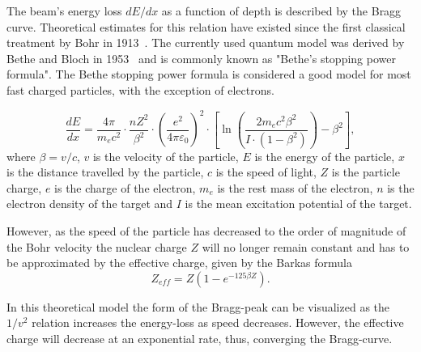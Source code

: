 The beam's energy loss $dE/dx$ as a function of depth is described by the Bragg curve. %
 Theoretical estimates for this relation have existed since the first classical treatment by Bohr in 1913~\cite{bohr13}. The currently used quantum model was derived by Bethe and Bloch in 1953~\cite{bethebloch53}  and is commonly known as "Bethe's stopping power formula". The Bethe stopping power formula is considered a good model for most fast charged particles, with the exception of electrons.

\begin{equation}
 \frac{dE}{dx} = \frac{4 \pi}{m_e c^2} \cdot \frac{nZ^2}{\beta^2} \cdot \left(\frac{e^2}{4\pi\varepsilon_0}\right)^2 \cdot \left[\ln \left(\frac{2m_e c^2 \beta^2}{I \cdot (1-\beta^2)}\right) - \beta^2\right],
\label{bethebloch}
\end{equation}
where $\beta = v/c $, 
$v$ is the velocity of the particle,
$E$ is the 
energy of the particle,
$x$ is the 
distance travelled by the particle,
$c$ is the 
speed of light,
$Z$ is the 
particle charge,
$e$ is the 
charge of the electron,
$m_e$ is the 
rest mass of the electron,
$n$ is the 
electron density of the target and 
$I$  is the 
mean excitation potential of the target.


However, as the speed of the particle has decreased to the order of magnitude of the Bohr velocity the nuclear charge $Z$ will no longer remain constant and has to be approximated by the effective charge, given by the Barkas formula \begin{equation}Z_{eff} = Z(1-e^{-125 \beta Z}).\end{equation}

In this theoretical model the form of the Bragg-peak can be visualized as the $1/v^2$ relation increases the energy-loss as speed decreases. However, the effective charge will decrease at an exponential rate, thus, converging the Bragg-curve.

